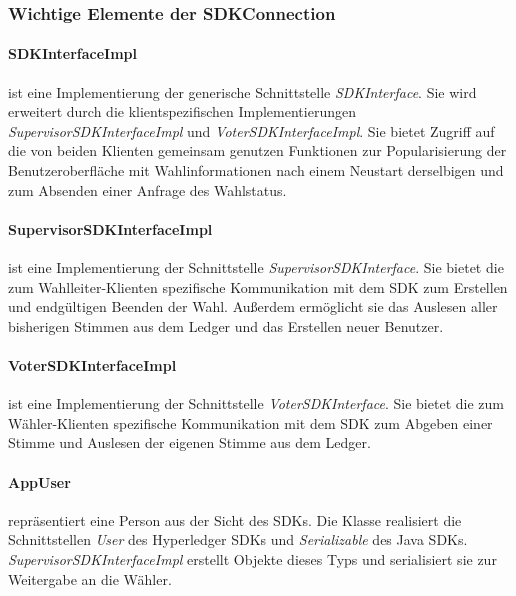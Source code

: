 \documentclass[parskip=full]{scrartcl}
\newcommand{\textitx}[1]{\mbox{\textit{#1}}}
\begin{document}
	\subsubsection{Wichtige Elemente der SDKConnection}
	\paragraph{SDKInterfaceImpl} ist eine Implementierung der generische Schnittstelle \textitx{SDKInterface}. Sie wird erweitert durch die klientspezifischen Implementierungen \textit{SupervisorSDKInterfaceImpl} und \textit{VoterSDKInterfaceImpl}. Sie bietet Zugriff auf die von beiden Klienten gemeinsam genutzen Funktionen zur Popularisierung der Benutzeroberfläche mit Wahlinformationen nach einem Neustart derselbigen und zum Absenden einer Anfrage des Wahlstatus.
	\paragraph{SupervisorSDKInterfaceImpl} ist eine Implementierung der Schnittstelle \textit{SupervisorSDKInterface}. Sie bietet die zum Wahlleiter-Klienten spezifische Kommunikation mit dem SDK zum Erstellen und endgültigen Beenden der Wahl. Außerdem ermöglicht sie das Auslesen aller bisherigen Stimmen aus dem Ledger und das Erstellen neuer Benutzer.
	\paragraph{VoterSDKInterfaceImpl} ist eine Implementierung der Schnittstelle \textit{VoterSDKInterface}. Sie bietet die zum Wähler-Klienten spezifische Kommunikation mit dem SDK zum Abgeben einer Stimme und Auslesen der eigenen Stimme aus dem Ledger.
	\paragraph{AppUser} repräsentiert eine Person aus der Sicht des SDKs. Die Klasse realisiert die Schnittstellen \textitx{User} des Hyperledger SDKs und \textitx{Serializable} des Java SDKs. \textit{SupervisorSDKInterfaceImpl} erstellt Objekte dieses Typs und serialisiert sie zur Weitergabe an die Wähler.
\end{document}
